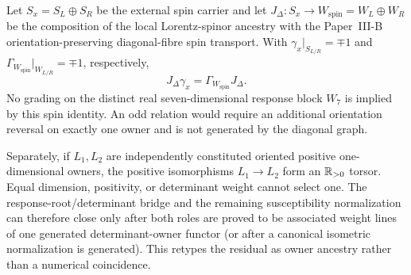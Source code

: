 \documentclass[12pt,a4paper]{article}
\begin{document}
\begin{corollary}
\label{p3e:cor:even-external-internal-grading-ancestry}
Let $S_x=S_L\oplus S_R$ be the external spin carrier and let
$J_\Delta:S_x\to W_{\mathrm{spin}}=W_L\oplus W_R$ be the composition
of the local Lorentz-spinor ancestry with the Paper~III-B
orientation-preserving diagonal-fibre spin transport.  With
$\gamma_x|_{S_{L/R}}=\mp1$ and
$\Gamma_{W_{\mathrm{spin}}}|_{W_{L/R}}=\mp1$, respectively,
\[
 \boxed{J_\Delta\gamma_x=\Gamma_{W_{\mathrm{spin}}}J_\Delta.}
\]
No grading on the distinct real seven-dimensional response block $W_7$
is implied by this spin identity.
An odd relation would require an additional orientation reversal on exactly
one owner and is not generated by the diagonal graph.
\end{corollary}

Separately, if $L_1,L_2$ are independently constituted oriented positive
one-dimensional owners, the positive isomorphisms $L_1\to L_2$ form an
$\mathbb{R}_{>0}$ torsor.  Equal dimension, positivity, or determinant weight cannot
select one.  The response-root/determinant bridge and the remaining
susceptibility normalization can therefore close only after both roles are
proved to be associated weight lines of one generated determinant-owner
functor (or after a canonical isometric normalization is generated).  This
retypes the residual as owner ancestry rather than a numerical coincidence.
\end{document}
